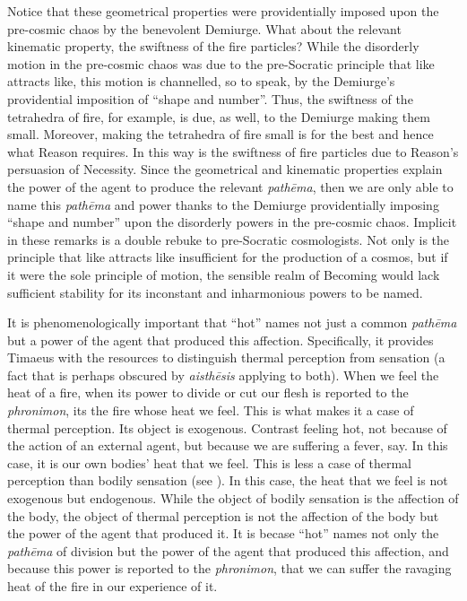 Notice that these geometrical properties were providentially imposed upon the pre-cosmic chaos by the benevolent Demiurge. What about the relevant kinematic property, the swiftness of the fire particles? While the disorderly motion in the pre-cosmic chaos was due to the pre-Socratic principle that like attracts like, this motion is channelled, so to speak, by the Demiurge's providential imposition of ``shape and number''. Thus, the swiftness of the tetrahedra of fire, for example, is due, as well, to the Demiurge making them small. Moreover, making the tetrahedra of fire small is for the best and hence what Reason requires. In this way is the swiftness of fire particles due to Reason's persuasion of Necessity. Since the geometrical and kinematic properties explain the power of the agent to produce the relevant \emph{pathēma}, then we are only able to name this \emph{pathēma} and power thanks to the Demiurge providentially imposing ``shape and number'' upon the disorderly powers in the pre-cosmic chaos. Implicit in these remarks is a double rebuke to pre-Socratic cosmologists. Not only is the principle that like attracts like insufficient for the production of a cosmos, but if it were the sole principle of motion, the sensible realm of Becoming would lack sufficient stability for its inconstant and inharmonious powers to be named.

It is phenomenologically important that ``hot'' names not just a common \emph{pathēma} but a power of the agent that produced this affection. Specifically, it provides Timaeus with the resources to distinguish thermal perception from sensation (a fact that is perhaps obscured by \emph{aisthēsis} applying to both). When we feel the heat of a fire, when its power to divide or cut our flesh is reported to the \emph{phronimon}, its the fire whose heat we feel. This is what makes it a case of thermal perception. Its object is exogenous. Contrast feeling hot, not because of the action of an external agent, but because we are suffering a fever, say. In this case, it is our own bodies' heat that we feel. This is less a case of thermal perception than bodily sensation (see \citealt{Yrjonsuuri:2008aa}). In this case, the heat that we feel is not exogenous but endogenous. While the object of bodily sensation is the affection of the body, the object of thermal perception is not the affection of the body but the power of the agent that produced it.  It is becase ``hot'' names not only the \emph{pathēma} of division but the power of the agent that produced this affection, and because this power is reported to the \emph{phronimon}, that we can suffer the ravaging heat of the fire in our experience of it.

